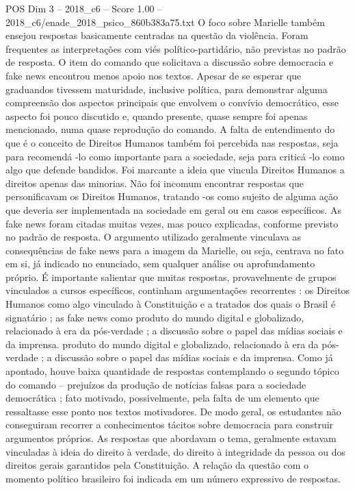 \begin{textsample}{POS Dim 3 – 2018\_c6 – Score 1.00 – 2018\_c6/enade\_2018\_psico\_860b383a75.txt}
O foco sobre Marielle também ensejou respostas basicamente centradas na questão da violência.
Foram frequentes as interpretações com viés político-partidário, não previstas no padrão de resposta.
O item do comando que solicitava a discussão sobre democracia e fake news encontrou menos apoio nos textos.
Apesar de se esperar que graduandos tivessem maturidade, inclusive política, para demonstrar alguma compreensão dos aspectos principais que envolvem o convívio democrático, esse aspecto foi pouco discutido e, quando presente, quase sempre foi apenas mencionado, numa quase reprodução do comando.
A falta de entendimento do que é o conceito de Direitos Humanos também foi percebida nas respostas, seja para recomendá -lo como importante para a sociedade, seja para criticá -lo como algo que defende bandidos.
Foi marcante a ideia que vincula Direitos Humanos a direitos apenas das minorias.
Não foi incomum encontrar respostas que personificavam os Direitos Humanos, tratando -os como sujeito de alguma ação que deveria ser implementada na sociedade em geral ou em casos específicos.
As fake news foram citadas muitas vezes, mas pouco explicadas, conforme previsto no padrão de resposta.
O argumento utilizado geralmente vinculava as consequências de fake news para a imagem da Marielle, ou seja, centrava no fato em si, já indicado no enunciado, sem qualquer análise ou aprofundamento próprio.
É importante salientar que muitas respostas, provavelmente de grupos vinculados a cursos específicos, continham argumentações recorrentes : os Direitos Humanos como algo vinculado à Constituição e a tratados dos quais o Brasil é signatário ; as fake news como produto do mundo digital e globalizado, relacionado à era da pós-verdade ; a discussão sobre o papel das mídias sociais e da imprensa. produto do mundo digital e globalizado, relacionado à era da pós-verdade ; a discussão sobre o papel das mídias sociais e da imprensa.
Como já apontado, houve baixa quantidade de respostas contemplando o segundo tópico do comando – prejuízos da produção de notícias falsas para a sociedade democrática ; fato motivado, possivelmente, pela falta de um elemento que ressaltasse esse ponto nos textos motivadores.
De modo geral, os estudantes não conseguiram recorrer a conhecimentos tácitos sobre democracia para construir argumentos próprios.
As respostas que abordavam o tema, geralmente estavam vinculadas à ideia do direito à verdade, do direito à integridade da pessoa ou dos direitos gerais garantidos pela Constituição.
A relação da questão com o momento político brasileiro foi indicada em um número expressivo de respostas.

\end{textsample}
